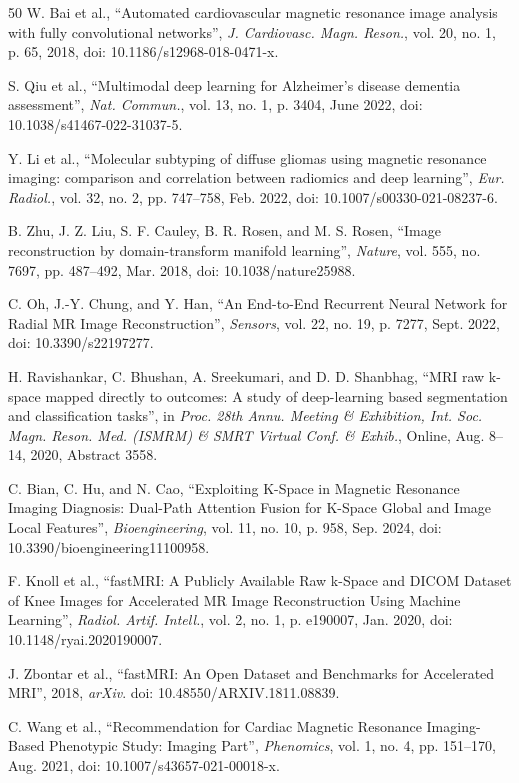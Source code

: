 \documentclass[12pt,a4paper]{article}
\begin{document}
\begin{thebibliography}{50}
W. Bai et al., ``Automated cardiovascular magnetic resonance image analysis with fully convolutional networks'', \textit{J. Cardiovasc. Magn. Reson.}, vol. 20, no. 1, p. 65, 2018, doi: 10.1186/s12968-018-0471-x.

S. Qiu et al., ``Multimodal deep learning for Alzheimer’s disease dementia assessment'',  \textit{Nat. Commun.}, vol. 13, no. 1, p. 3404, June 2022, doi: 10.1038/s41467-022-31037-5.

Y. Li et al., ``Molecular subtyping of diffuse gliomas using magnetic resonance imaging: comparison and correlation between radiomics and deep learning'', \textit{Eur. Radiol.}, vol. 32, no. 2, pp. 747–758, Feb. 2022, doi: 10.1007/s00330-021-08237-6.

B. Zhu, J. Z. Liu, S. F. Cauley, B. R. Rosen, and M. S. Rosen, ``Image reconstruction by domain-transform manifold learning'', \textit{Nature}, vol. 555, no. 7697, pp. 487–492, Mar. 2018, doi: 10.1038/nature25988.

C. Oh, J.-Y. Chung, and Y. Han, ``An End-to-End Recurrent Neural Network for Radial MR Image Reconstruction'', \textit{Sensors}, vol. 22, no. 19, p. 7277, Sept. 2022, doi: 10.3390/s22197277.

H. Ravishankar, C. Bhushan, A. Sreekumari, and D. D. Shanbhag, ``MRI raw k-space mapped directly to outcomes: A study of deep-learning based segmentation and classification tasks'', in \textit{Proc. 28th Annu. Meeting \& Exhibition, Int. Soc. Magn. Reson. Med. (ISMRM) \& SMRT Virtual Conf. \& Exhib.}, Online, Aug. 8–14, 2020, Abstract 3558.

C. Bian, C. Hu, and N. Cao, ``Exploiting K-Space in Magnetic Resonance Imaging Diagnosis: Dual-Path Attention Fusion for K-Space Global and Image Local Features'', \textit{Bioengineering}, vol. 11, no. 10, p. 958, Sep. 2024, doi: 10.3390/bioengineering11100958.

F. Knoll et al., ``fastMRI: A Publicly Available Raw k-Space and DICOM Dataset of Knee Images for Accelerated MR Image Reconstruction Using Machine Learning'', \textit{Radiol. Artif. Intell.}, vol. 2, no. 1, p. e190007, Jan. 2020, doi: 10.1148/ryai.2020190007.

J. Zbontar et al., ``fastMRI: An Open Dataset and Benchmarks for Accelerated MRI'', 2018, \textit{arXiv}. doi: 10.48550/ARXIV.1811.08839.

C. Wang et al., ``Recommendation for Cardiac Magnetic Resonance Imaging-Based Phenotypic Study: Imaging Part'', \textit{Phenomics}, vol. 1, no. 4, pp. 151–170, Aug. 2021, doi: 10.1007/s43657-021-00018-x.


\end{thebibliography}
\end{document}
